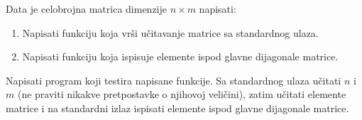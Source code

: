 \begin{Exercise}[label=332]
Data je celobrojna matrica dimenzije $n \times m$ napisati:
\begin{enumerate}
\item Napisati funkciju koja vrši učitavanje matrice sa standardnog ulaza.
\item Napisati funkciju koja ispisuje elemente ispod glavne dijagonale matrice.
\end{enumerate}
Napisati program koji testira napisane funkcije. Sa standardnog
ulaza učitati $n$ i $m$ (ne praviti nikakve
pretpostavke o njihovoj veličini), zatim učitati elemente
matrice i na standardni izlaz ispisati elemente ispod glavne
dijagonale matrice.

\end{Exercise}
\begin{Answer}[ref=332]
\end{Answer}

